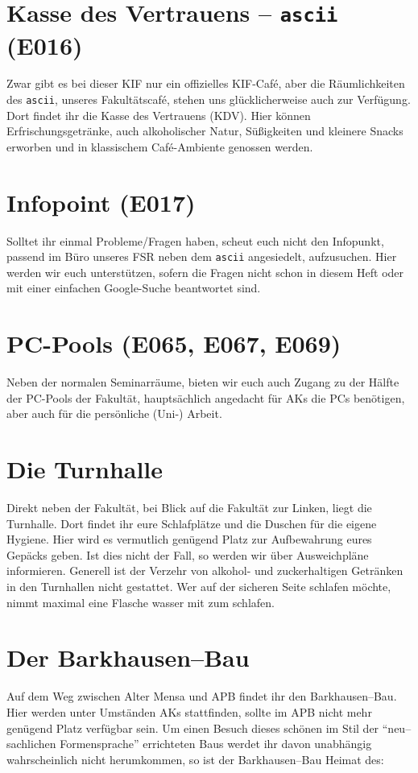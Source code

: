 \section*{Kasse des Vertrauens – \texttt{ascii} (E016)}
Zwar gibt es bei dieser KIF nur ein offizielles KIF-Café, aber die Räumlichkeiten des \texttt{ascii}, unseres Fakultätscafé, stehen uns glücklicherweise auch zur Verfügung.
Dort findet ihr die Kasse des Vertrauens (KDV).
Hier können Erfrischungsgetränke, auch alkoholischer Natur, Süßigkeiten und kleinere Snacks erworben und in klassischem Café-Ambiente genossen werden.

\section*{Infopoint (E017)}
Solltet ihr einmal Probleme/Fragen haben, scheut euch nicht den Infopunkt, passend im Büro unseres FSR neben dem \texttt{ascii} angesiedelt, aufzusuchen.
Hier werden wir euch unterstützen, sofern die Fragen nicht schon in diesem Heft oder mit einer einfachen Google-Suche beantwortet sind.

\section*{PC-Pools (E065, E067, E069)}
Neben der normalen Seminarräume, bieten wir euch auch Zugang zu der Hälfte der PC-Pools der Fakultät, hauptsächlich angedacht für AKs die PCs benötigen, aber auch für die persönliche (Uni-) Arbeit.

\section*{Die Turnhalle}
Direkt neben der Fakultät, bei Blick auf die Fakultät zur Linken, liegt die Turnhalle.
Dort findet ihr eure Schlafplätze und die Duschen für die eigene Hygiene.
Hier wird es vermutlich genügend Platz zur Aufbewahrung eures Gepäcks geben.
Ist dies nicht der Fall, so werden wir über Ausweichpläne informieren.
Generell ist der Verzehr von alkohol- und zuckerhaltigen Getränken in den Turnhallen nicht gestattet.
Wer auf der sicheren Seite schlafen möchte, nimmt maximal eine Flasche wasser mit zum schlafen.

\section*{Der Barkhausen--Bau}
Auf dem Weg zwischen Alter Mensa und APB findet ihr den Barkhausen--Bau.
Hier werden unter Umständen AKs stattfinden, sollte im APB nicht mehr genügend Platz verfügbar sein.
Um einen Besuch dieses schönen im Stil der \enquote{neu--sachlichen Formensprache} errichteten Baus werdet ihr davon unabhängig wahrscheinlich nicht herumkommen, so ist der Barkhausen--Bau Heimat des:

